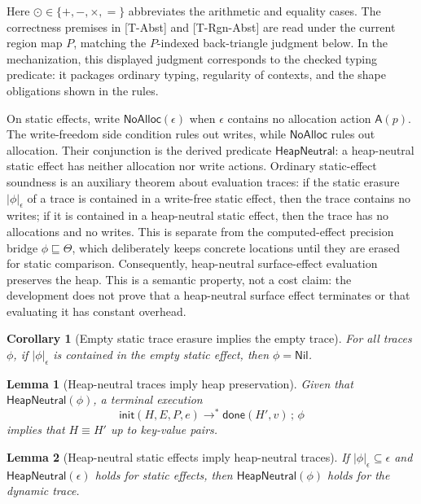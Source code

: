 \documentclass[10pt,a4paper]{article}
\newcommand{\approxx}{\mathrel{\sqsubseteq}}          %
\newcommand{\As}{\mathsf{A}}
\newcommand{\Nil}{\mathsf{Nil}}
\newcommand{\HeapNeutral}{\mathsf{HeapNeutral}}
\newcommand{\NoAlloc}{\mathsf{NoAlloc}}
\newcommand{\staticset}[1]{\lvert #1\rvert_{\epsilon}}
\newtheorem{lemma}{Lemma}
\newtheorem{corollary}{Corollary}
\begin{document}
Here $\odot \in \{+,-,\times,=\}$ abbreviates the arithmetic and equality
cases. The correctness premises in [T-Abst] and [T-Rgn-Abst] are read under the
current region map $P$, matching the $P$-indexed back-triangle judgment below.
In the mechanization, this displayed judgment corresponds to the checked
typing predicate: it packages ordinary typing, regularity of contexts, and the
shape obligations shown in the rules.

On static effects, write $\NoAlloc(\epsilon)$ when $\epsilon$ contains no
allocation action $\As(p)$. The write-freedom side condition rules out writes,
while $\NoAlloc$ rules out allocation. Their conjunction is the derived
predicate $\HeapNeutral$: a heap-neutral static effect has neither allocation
nor write actions. Ordinary static-effect soundness is an auxiliary theorem
about evaluation traces: if the static erasure $\staticset{\phi}$ of a trace is
contained in a write-free static effect, then the trace contains no writes; if it
is contained in a heap-neutral static effect, then the trace has no allocations
and no writes. This is separate from the computed-effect precision bridge
$\phi\approxx\Theta$, which deliberately keeps concrete locations until they
are erased for static comparison. Consequently, heap-neutral surface-effect
evaluation preserves the heap. This is a semantic property, not a cost claim:
the development does not prove that a heap-neutral surface effect terminates or
that evaluating it has constant overhead.

\begin{corollary}[Empty static trace erasure implies the empty trace]
For all traces $\phi$, if $\staticset{\phi}$ is contained in the empty static
effect, then $\phi = \Nil$.
\end{corollary}

\begin{lemma}[Heap-neutral traces imply heap preservation]
Given that $\HeapNeutral(\phi)$, a terminal execution
\[
\mathsf{init}(H,E,P,e)\longrightarrow^{*}\mathsf{done}(H',v)\,;\,\phi
\]
implies that $H \equiv H'$ up to key-value pairs.
\end{lemma}

\begin{lemma}[Heap-neutral static effects imply heap-neutral traces]
If $\staticset{\phi}\subseteq \epsilon$ and $\HeapNeutral(\epsilon)$ holds for
static effects, then $\HeapNeutral(\phi)$ holds for the dynamic trace.
\end{lemma}
\end{document}
